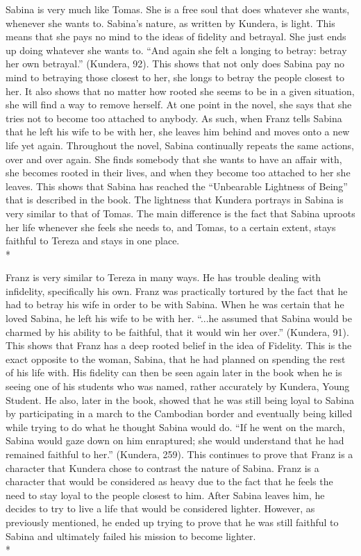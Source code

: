\documentclass[12pt, letterpaper]{report}
\begin{document}
    Sabina is very much like Tomas. She is a free soul that does whatever she wants, whenever she wants to. Sabina’s nature, as written by Kundera, is light. This means that she pays no mind to the ideas of fidelity and betrayal. She just ends up doing whatever she wants to. “And again she felt a longing to betray: betray her own betrayal.” (Kundera, 92). This shows that not only does Sabina pay no mind to betraying those closest to her, she longs to betray the people closest to her. It also shows that no matter how rooted she seems to be in a given situation, she will find a way to remove herself. At one point in the novel, she says that she tries not to become too attached to anybody. As such, when Franz tells Sabina that he left his wife to be with her, she leaves him behind and moves onto a new life yet again. Throughout the novel, Sabina continually repeats the same actions, over and over again. She finds somebody that she wants to have an affair with, she becomes rooted in their lives, and when they become too attached to her she leaves. This shows that Sabina has reached the “Unbearable Lightness of Being” that is described in the book. The lightness that Kundera portrays in Sabina is very similar to that of Tomas. The main difference is the fact that Sabina uproots her life whenever she feels she needs to, and Tomas, to a certain extent, stays faithful to Tereza and stays in one place.\\*
    
    Franz is very similar to Tereza in many ways. He has trouble dealing with infidelity, specifically his own. Franz was practically tortured by the fact that he had to betray his wife in order to be with Sabina. When he was certain that he loved Sabina, he left his wife to be with her. “...he assumed that Sabina would be charmed by his ability to be faithful, that it would win her over.” (Kundera, 91). This shows that Franz has a deep rooted belief in the idea of Fidelity. This is the exact opposite to the woman, Sabina, that he had planned on spending the rest of his life with. His fidelity can then be seen again later in the book when he is seeing one of his students who was named, rather accurately by Kundera, Young Student. He also, later in the book, showed that he was still being loyal to Sabina by participating in a march to the Cambodian border and eventually being killed while trying to do what he thought Sabina would do. “If he went on the march, Sabina would gaze down on him enraptured; she would understand that he had remained faithful to her.” (Kundera, 259). This continues to prove that Franz is a character that Kundera chose to contrast the nature of Sabina. Franz is a character that would be considered as heavy due to the fact that he feels the need to stay loyal to the people closest to him. After Sabina leaves him, he decides to try to live a life that would be considered lighter. However, as previously mentioned, he ended up trying to prove that he was still faithful to Sabina and ultimately failed his mission to become lighter.\\*
    
\end{document}
